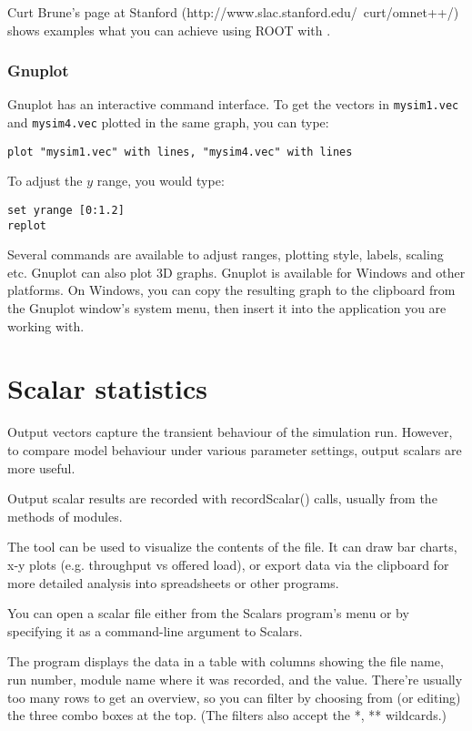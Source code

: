 Curt Brune's page at Stanford (http://www.slac.stanford.edu/~curt/omnet++/)
shows examples what you can achieve using ROOT with {\opp}.


\subsubsection{Gnuplot}

Gnuplot has an interactive command interface. To get the vectors in
\texttt{mysim1.vec} and \texttt{mysim4.vec} plotted in the same graph,
you can type:

\begin{verbatim}
plot "mysim1.vec" with lines, "mysim4.vec" with lines
\end{verbatim}

To adjust the $y$ range, you would type:

\begin{verbatim}
set yrange [0:1.2]
replot
\end{verbatim}

Several commands are available to adjust ranges, plotting style, labels,
scaling etc. Gnuplot can also plot 3D graphs. Gnuplot
is available for Windows and other platforms.
On Windows, you can copy the resulting graph to the clipboard from
the Gnuplot window's system menu, then insert it into the application you
are working with.


\section{Scalar statistics}

Output vectors capture the transient behaviour of the simulation run.
However, to compare model behaviour under various parameter settings,
output scalars are more useful.

Output scalar results are recorded with recordScalar() calls,
usually from the  methods of modules.

The  tool can be used to visualize the contents of the
 file. It can draw bar charts, x-y plots
(e.g. throughput vs offered load), or export data via the clipboard
for more detailed analysis into spreadsheets or other programs.

You can open a scalar file either from the Scalars program's menu
or by specifying it as a command-line argument to Scalars.

The program displays the data in a table with columns showing the
file name, run number, module name where it was recorded, and the value.
There're usually too many rows to get an overview, so you can filter
by choosing from (or editing) the three combo boxes at the top.
(The filters also accept the *, ** wildcards.)

